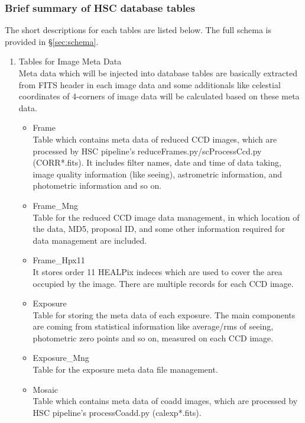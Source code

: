 \documentclass[12pt]{article}
\begin{document}
\subsubsection{Brief summary of HSC database tables}
The short descriptions for each tables are listed below.  The full schema is provided in \S\ref{sec:schema}.

\begin{enumerate}
\item Tables for Image Meta Data\\
Meta data which will be injected into database tables are basically extracted from FITS header 
in each image data and some additionals like celestial coordinates of 4-corners of image data 
will be calculated based on these meta data.  

\begin{itemize}
\item Frame\\
Table which contains meta data of reduced CCD images, which are processed by HSC pipeline's 
reduceFrames.py/scProcessCcd.py (CORR*.fits). It includes filter names, date and time of 
data taking, image quality information (like seeing), astrometric information, and photometric 
information and so on. 

\item Frame\_Mng\\
Table for the reduced CCD image data management, in which location of the data, MD5, proposal ID, 
and some other information required for data management are included. 

\item Frame\_Hpx11\\
It stores order 11 HEALPix indeces which are used to cover the area occupied by the image. There are 
multiple records for each CCD image.  

\item Exposure\\
Table for storing the meta data of each exposure. The main components are coming from statistical 
information like average/rms of seeing, photometric zero points and so on, measured on each CCD image.  

\item Exposure\_Mng\\
Table for the exposure meta data file management. 

\item Mosaic\\
Table which contains meta data of coadd images, which are processed by HSC pipeline's 
processCoadd.py (calexp*.fits). 


\end{itemize}
\end{enumerate}
\end{document}
